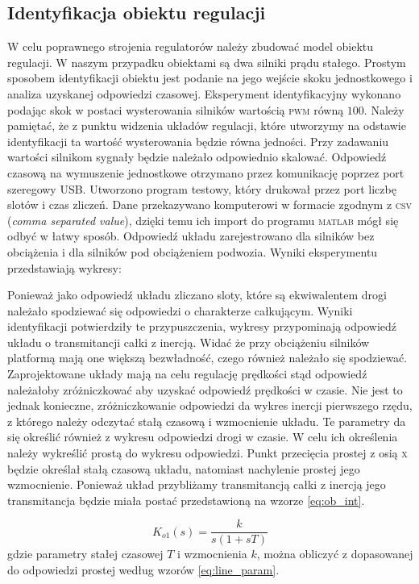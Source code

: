 \documentclass[11pt]{article}
\begin{document}
\subsection{Identyfikacja obiektu regulacji}
W celu poprawnego strojenia regulatorów należy zbudować model obiektu regulacji.
W naszym przypadku obiektami są dwa silniki prądu stałego.
Prostym sposobem identyfikacji obiektu jest podanie na jego wejście skoku jednostkowego i analiza uzyskanej odpowiedzi czasowej.
Eksperyment identyfikacyjny wykonano podając skok w postaci wysterowania silników wartością \textsc{pwm} równą $ 100 $.
Należy pamiętać, że z punktu widzenia układów regulacji, które utworzymy na odstawie identyfikacji ta wartość wysterowania będzie równa jedności.
Przy zadawaniu wartości silnikom sygnały będzie należało odpowiednio skalować.
Odpowiedź czasową na wymuszenie jednostkowe otrzymano przez komunikację poprzez port szeregowy USB.
Utworzono program testowy, który drukował przez port liczbę slotów i czas zliczeń.
Dane przekazywano komputerowi w formacie zgodnym z \textsc{csv} (\textit{comma separated value}), dzięki temu ich import do programu \textsc{matlab} mógł się odbyć w łatwy sposób.
Odpowiedź układu zarejestrowano dla silników bez obciążenia i dla silników pod obciążeniem podwozia.
Wyniki eksperymentu przedstawiają wykresy: %


Ponieważ jako odpowiedź układu zliczano sloty, które są ekwiwalentem drogi należało spodziewać się odpowiedzi o charakterze całkującym.
Wyniki identyfikacji potwierdziły te przypuszczenia, wykresy przypominają odpowiedź układu o transmitancji całki z inercją.
Widać że przy obciążeniu silników platformą mają one większą bezwładność, czego również należało się spodziewać.
Zaprojektowane układy mają na celu regulację prędkości stąd odpowiedź należałoby zróżniczkować aby uzyskać odpowiedź prędkości w czasie.
Nie jest to jednak konieczne, zróżniczkowanie odpowiedzi da wykres inercji pierwszego rzędu, z którego należy odczytać stałą czasową i wzmocnienie układu.
Te parametry da się określić również z wykresu odpowiedzi drogi w czasie.
W celu ich określenia należy wykreślić prostą do wykresu odpowiedzi.
Punkt przecięcia prostej z osią \textsc{x} będzie określał stałą czasową układu, natomiast nachylenie prostej jego wzmocnienie.
Ponieważ układ przybliżamy transmitancją całki z inercją jego transmitancja będzie miała postać przedstawioną na wzorze \ref{eq:ob_int}.

\begin{equation} \label{eq:ob_int}
	K_{o1} \left( s \right) = \frac{k}{s \left( 1 + sT \right)}
\end{equation}
gdzie parametry stałej czasowej $ T $ i wzmocnienia $ k $, można obliczyć z dopasowanej do odpowiedzi prostej według wzorów \ref{eq:line_param}.
\end{document}
